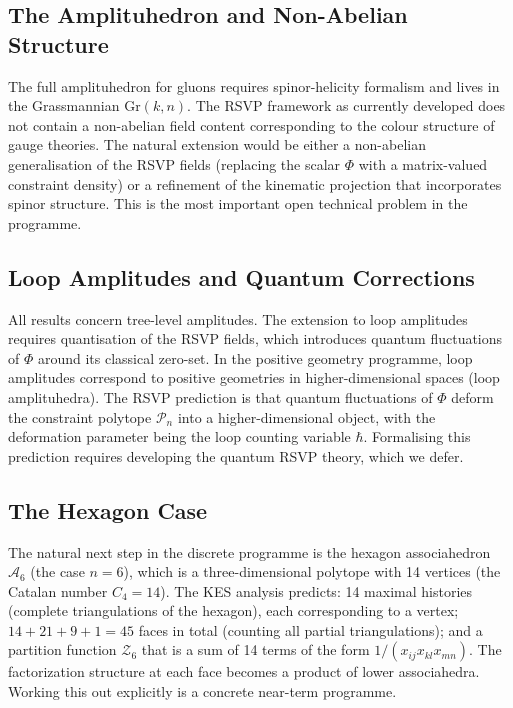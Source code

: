 \documentclass[12pt, oneside]{amsart}
\theoremstyle{plain}
\theoremstyle{definition}
\theoremstyle{remark}
\newcommand{\Gr}{\mathrm{Gr}}
\newcommand{\Phif}{\Phi}   %
\begin{document}
\subsection{The Amplituhedron and Non-Abelian Structure}

The full amplituhedron for gluons requires spinor-helicity formalism and lives in the Grassmannian $\Gr(k,n)$. The RSVP framework as currently developed does not contain a non-abelian field content corresponding to the colour structure of gauge theories. The natural extension would be either a non-abelian generalisation of the RSVP fields (replacing the scalar $\Phif$ with a matrix-valued constraint density) or a refinement of the kinematic projection that incorporates spinor structure. This is the most important open technical problem in the programme.

\subsection{Loop Amplitudes and Quantum Corrections}

All results concern tree-level amplitudes. The extension to loop amplitudes requires quantisation of the RSVP fields, which introduces quantum fluctuations of $\Phif$ around its classical zero-set. In the positive geometry programme, loop amplitudes correspond to positive geometries in higher-dimensional spaces (loop amplituhedra). The RSVP prediction is that quantum fluctuations of $\Phif$ deform the constraint polytope $\mathcal{P}_n$ into a higher-dimensional object, with the deformation parameter being the loop counting variable $\hbar$. Formalising this prediction requires developing the quantum RSVP theory, which we defer.

\subsection{The Hexagon Case}

The natural next step in the discrete programme is the hexagon associahedron $\mathcal{A}_6$ (the case $n=6$), which is a three-dimensional polytope with 14 vertices (the Catalan number $C_4 = 14$). The KES analysis predicts: 14 maximal histories (complete triangulations of the hexagon), each corresponding to a vertex; $14 + 21 + 9 + 1 = 45$ faces in total (counting all partial triangulations); and a partition function $\mathcal{Z}_6$ that is a sum of 14 terms of the form $1/(x_{ij}x_{kl}x_{mn})$. The factorization structure at each face becomes a product of lower associahedra. Working this out explicitly is a concrete near-term programme.
\end{document}

